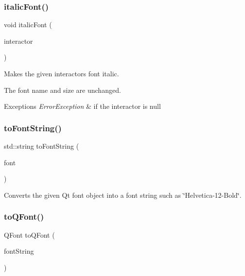 \subsubsection{\texorpdfstring{italic\+Font()}{italicFont()}}
{\footnotesize\ttfamily void italic\+Font (\begin{DoxyParamCaption}\item[{\mbox{\hyperlink{classGInteractor}{G\+Interactor}} $\ast$}]{interactor }\end{DoxyParamCaption})\hspace{0.3cm}{\ttfamily [static]}}



Makes the given interactor\textquotesingle{}s font italic. 

The font name and size are unchanged. 
\begin{DoxyExceptions}{Exceptions}
{\em Error\+Exception} & if the interactor is null \\
\hline
\end{DoxyExceptions}
\mbox{\label{classGFont_a1e897239fcf0fa78a33f3021a98b0029}} 
\subsubsection{\texorpdfstring{to\+Font\+String()}{toFontString()}}
{\footnotesize\ttfamily std\+::string to\+Font\+String (\begin{DoxyParamCaption}\item[{const Q\+Font \&}]{font }\end{DoxyParamCaption})\hspace{0.3cm}{\ttfamily [static]}}



Converts the given Qt font object into a font string such as \char`\"{}\+Helvetica-\/12-\/\+Bold\char`\"{}. 

\mbox{\label{classGFont_aea0f70979b631219291103391bfacc6e}} 
\subsubsection{\texorpdfstring{to\+Q\+Font()}{toQFont()}\hspace{0.1cm}{\footnotesize\ttfamily [1/2]}}
{\footnotesize\ttfamily Q\+Font to\+Q\+Font (\begin{DoxyParamCaption}\item[{const std\+::string \&}]{font\+String }\end{DoxyParamCaption})\hspace{0.3cm}{\ttfamily [static]}}



